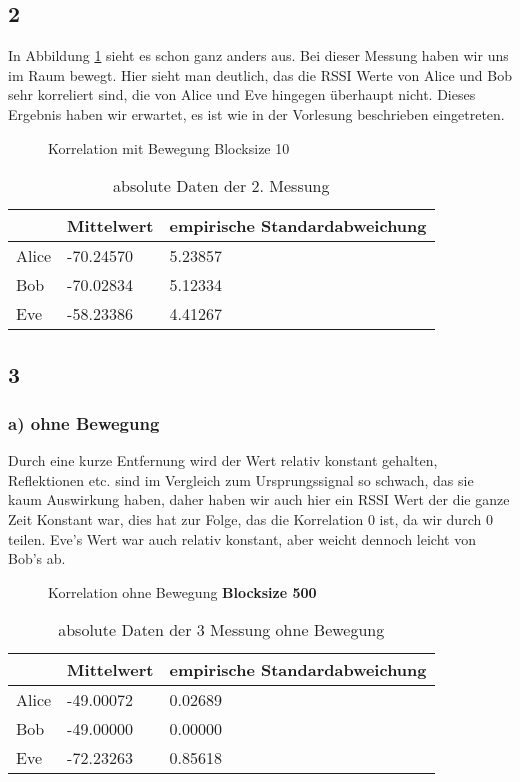\documentclass[12pt,a4paper]{article}
\begin{document}
\subsection*{2}
In Abbildung \ref{fig:2} sieht es schon ganz anders aus. Bei dieser Messung haben wir uns im Raum bewegt. Hier sieht man deutlich, das die RSSI Werte von Alice und Bob sehr korreliert sind, die von Alice und Eve hingegen überhaupt nicht. Dieses Ergebnis haben wir erwartet, es ist wie in der Vorlesung beschrieben eingetreten.
\begin{figure}[H]
\centering
{} \qquad
{}
\caption{Korrelation mit Bewegung Blocksize 10}
\label{fig:2}
\end{figure}
\begin{table}[H]
\centering
\begin{tabular}{l|l|l}
& Mittelwert & empirische Standardabweichung \\
\hline
Alice & -70.24570 & 5.23857 \\
\hline
Bob & -70.02834 & 5.12334 \\
\hline
Eve & -58.23386 & 4.41267 \\
\end{tabular}
\caption{absolute Daten der 2. Messung}
\end{table}
\subsection*{3}
\subsubsection*{a) ohne Bewegung}
Durch eine kurze Entfernung wird der Wert relativ konstant gehalten, Reflektionen etc. sind im Vergleich zum Ursprungssignal so schwach, das sie kaum Auswirkung haben, daher haben wir auch hier ein RSSI Wert der die ganze Zeit Konstant war, dies hat zur Folge, das die Korrelation 0 ist, da wir durch 0 teilen. Eve's Wert war auch relativ konstant, aber weicht dennoch leicht von Bob's ab.
\begin{figure}[H]
\centering
{} \qquad
{}
\caption{Korrelation ohne Bewegung \textbf{Blocksize 500}}
\label{fig:3_a_o}
\end{figure}
\begin{table}[H]
\centering
\begin{tabular}{l|l|l}
& Mittelwert & empirische Standardabweichung \\
\hline
Alice & -49.00072 & 0.02689 \\
\hline
Bob & -49.00000 & 0.00000 \\
\hline
Eve & -72.23263 & 0.85618 \\
\hline
\end{tabular}
\caption{absolute Daten der 3 Messung ohne Bewegung}
\end{table}
\end{document}

